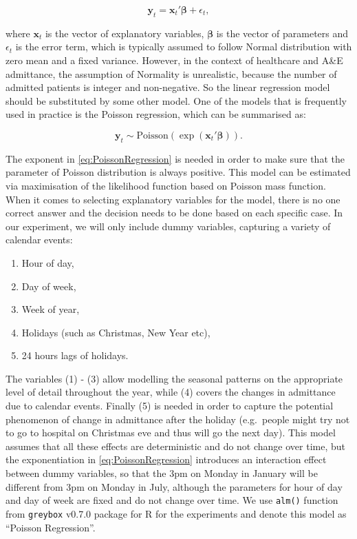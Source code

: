 \documentclass[]{elsarticle} %
\providecommand{\tightlist}{%
  \setlength{\itemsep}{0pt}\setlength{\parskip}{0pt}}
\begin{document}
\begin{equation}
  \mathbf{y}_t = \mathbf{x}_t' \boldsymbol{\beta} + \epsilon_t ,
\label{eq:linearRegression}
\end{equation}

where \(\mathbf{x}_t\) is the vector of explanatory variables, \(\boldsymbol{\beta}\) is the vector of parameters and \(\epsilon_t\) is the error term, which is typically assumed to follow Normal distribution with zero mean and a fixed variance. However, in the context of healthcare and A\&E admittance, the assumption of Normality is unrealistic, because the number of admitted patients is integer and non-negative. So the linear regression model should be substituted by some other model. One of the models that is frequently used in practice is the Poisson regression, which can be summarised as:

\begin{equation}
  \mathbf{y}_t \sim \mathrm{Poisson} \left( \exp \left( \mathbf{x}_t' \boldsymbol{\beta} \right) \right).
\label{eq:PoissonRegression}
\end{equation}

The exponent in \eqref{eq:PoissonRegression} is needed in order to make sure that the parameter of Poisson distribution is always positive. This model can be estimated via maximisation of the likelihood function based on Poisson mass function. When it comes to selecting explanatory variables for the model, there is no one correct answer and the decision needs to be done based on each specific case. In our experiment, we will only include dummy variables, capturing a variety of calendar events:

\begin{enumerate}
\def\labelenumi{\arabic{enumi}.}
\tightlist
\item
  Hour of day,
\item
  Day of week,
\item
  Week of year,
\item
  Holidays (such as Christmas, New Year etc),
\item
  24 hours lags of holidays.
\end{enumerate}

The variables (1) - (3) allow modelling the seasonal patterns on the appropriate level of detail throughout the year, while (4) covers the changes in admittance due to calendar events. Finally (5) is needed in order to capture the potential phenomenon of change in admittance after the holiday (e.g.~people might try not to go to hospital on Christmas eve and thus will go the next day). This model assumes that all these effects are deterministic and do not change over time, but the exponentiation in \eqref{eq:PoissonRegression} introduces an interaction effect between dummy variables, so that the 3pm on Monday in January will be different from 3pm on Monday in July, although the parameters for hour of day and day of week are fixed and do not change over time. We use \texttt{alm()} function from \texttt{greybox} v0.7.0 package \citep{Svetunkov2021Greybox} for R \citep{RTeam2021} for the experiments and denote this model as ``Poisson Regression''.
\end{document}
